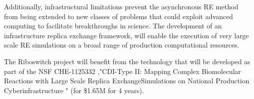 \documentclass[a4paper,11pt]{article}
\begin{document}
Additionally, infrastructural limitations prevent the asynchronous RE method from being extended to new classes of problems that could exploit advanced computing to facilitate breakthroughs in science. The development of an infrastructure replica exchange framework, will enable the execution of very large scale RE simulations on a broad range of production computational resources.

The Riboswitch project will benefit from the technology that will be developed as part of the NSF CHE-1125332 ,"CDI-Type II: Mapping Complex Biomolecular Reactions with Large Scale Replica ExchangeSimulations on National Production Cyberinfrastructure " (for \$1.65M for 4 years).



\end{document}
